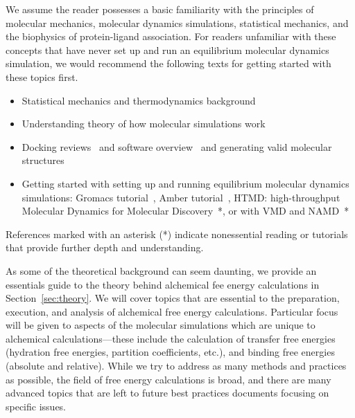 \documentclass[9pt,bestpractices]{livecoms}
\begin{document}
We assume the reader possesses a basic familiarity with the principles of molecular mechanics, molecular dynamics simulations, statistical mechanics, and the biophysics of protein-ligand association.
For readers unfamiliar with these concepts that have never set up and run an equilibrium molecular dynamics simulation, we would recommend the following texts for getting started with these topics first. 
\begin{itemize}
    \item Statistical mechanics and thermodynamics background~\cite{hill1956statistical, alavi2011statistical}
    \item Understanding theory of how molecular simulations work~\cite{frenkel2002understanding}
    \item Docking reviews~\cite{yuriev2013latest, meng2011molecular} and software overview~\cite{pagadala2017software} and generating valid molecular structures ~\cite{loeffler2015fesetup}
    \item Getting started with setting up and running equilibrium molecular dynamics simulations: Gromacs tutorial~\cite{lemkul2018From}, Amber tutorial~\cite{amber}, HTMD: high-throughput Molecular Dynamics for Molecular Discovery~\cite{doerr2016htmd}*, or with VMD and NAMD~\cite{ribeiro2016easy}*
\end{itemize}
References marked with an asterisk (*) indicate nonessential reading or tutorials that provide further depth and understanding.

As some of the theoretical background can seem daunting, we provide an essentials guide to the theory behind alchemical fee energy calculations in Section~\ref{sec:theory}. 
We will cover topics that are essential to the  preparation, execution, and analysis of alchemical free energy calculations. 
Particular focus will be given to aspects of the molecular simulations which are unique to alchemical calculations---these include the calculation of transfer free energies (hydration free energies, partition coefficients, etc.), and binding free energies (absolute and relative).
While we try to address as many methods and practices as possible, the field of free energy calculations is broad, and there are many advanced topics that are left to future best practices documents focusing on specific issues. 
\end{document}
